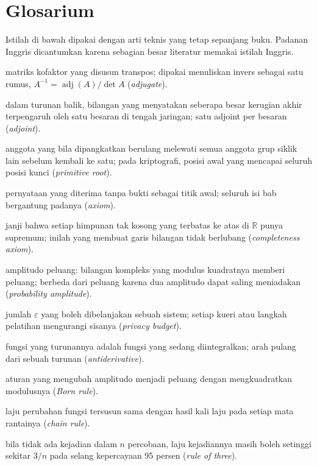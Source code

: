 \chapter{Glosarium}
\label{app:glosarium}

Istilah di bawah dipakai dengan arti teknis yang tetap sepanjang buku. Padanan
Inggris dicantumkan karena sebagian besar literatur memakai istilah Inggris.

\begin{description}[style=nextline,itemsep=0.35em]
  \item[Adjoin] matriks kofaktor yang disusun transpos; dipakai menuliskan invers sebagai satu rumus, $A^{-1}=\operatorname{adj}(A)/\det A$ (\emph{adjugate}).
  \item[Adjoint] dalam turunan balik, bilangan yang menyatakan seberapa besar kerugian akhir terpengaruh oleh satu besaran di tengah jaringan; satu adjoint per besaran (\emph{adjoint}).
  \item[Akar primitif] anggota yang bila dipangkatkan berulang melewati semua anggota grup siklik lain sebelum kembali ke satu; pada kriptografi, posisi awal yang mencapai seluruh posisi kunci (\emph{primitive root}).
  \item[Aksioma] pernyataan yang diterima tanpa bukti sebagai titik awal; seluruh isi bab bergantung padanya (\emph{axiom}).
  \item[Aksioma kelengkapan] janji bahwa setiap himpunan tak kosong yang terbatas ke atas di $\mathbb{R}$ punya supremum; inilah yang membuat garis bilangan tidak berlubang (\emph{completeness axiom}).
  \item[Amplitudo] amplitudo peluang: bilangan kompleks yang modulus kuadratnya memberi peluang; berbeda dari peluang karena dua amplitudo dapat saling meniadakan (\emph{probability amplitude}).
  \item[Anggaran privasi] jumlah $\varepsilon$ yang boleh dibelanjakan sebuah sistem; setiap kueri atau langkah pelatihan mengurangi sisanya (\emph{privacy budget}).
  \item[Antiturunan] fungsi yang turunannya adalah fungsi yang sedang diintegralkan; arah pulang dari sebuah turunan (\emph{antiderivative}).
  \item[Aturan Born] aturan yang mengubah amplitudo menjadi peluang dengan mengkuadratkan modulusnya (\emph{Born rule}).
  \item[Aturan rantai] laju perubahan fungsi tersusun sama dengan hasil kali laju pada setiap mata rantainya (\emph{chain rule}).
  \item[Aturan tiga] bila tidak ada kejadian dalam $n$ percobaan, laju kejadiannya masih boleh setinggi sekitar $3/n$ pada selang kepercayaan 95 persen (\emph{rule of three}).

\end{description}
